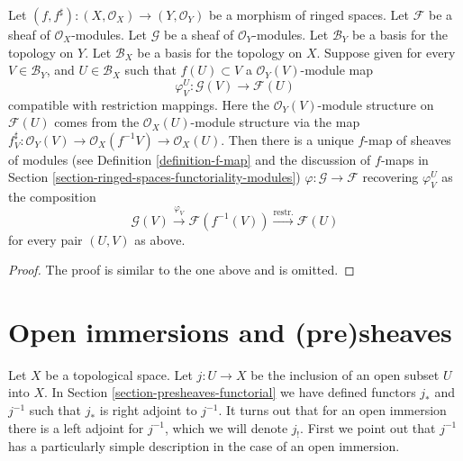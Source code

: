 \begin{lemma}
\label{lemma-f-map-basis-above-and-below-modules}
Let $(f, f^\sharp) : (X, \mathcal{O}_X) \to (Y, \mathcal{O}_Y)$
be a morphism of ringed spaces.
Let $\mathcal{F}$ be a sheaf of $\mathcal{O}_X$-modules.
Let $\mathcal{G}$ be a sheaf of $\mathcal{O}_Y$-modules.
Let $\mathcal{B}_Y$ be a basis for the topology on $Y$.
Let $\mathcal{B}_X$ be a basis for the topology on $X$.
Suppose given for every $V \in \mathcal{B}_Y$, and
$U \in \mathcal{B}_X$ such that $f(U) \subset V$ a
$\mathcal{O}_Y(V)$-module map
$$
\varphi_V^U :
\mathcal{G}(V)
\longrightarrow
\mathcal{F}(U)
$$
compatible with restriction mappings. Here the
$\mathcal{O}_Y(V)$-module structure on $\mathcal{F}(U)$
comes from the $\mathcal{O}_X(U)$-module structure
via the map $f^\sharp_V : \mathcal{O}_Y(V)
\to \mathcal{O}_X(f^{-1}V) \to \mathcal{O}_X(U)$.
Then there is a unique $f$-map of sheaves of modules (see
Definition \ref{definition-f-map} and the discussion
of $f$-maps in Section \ref{section-ringed-spaces-functoriality-modules})
$\varphi : \mathcal{G} \to \mathcal{F}$
recovering $\varphi_V^U$ as the composition
$$
\mathcal{G}(V) \xrightarrow{\varphi_V}
\mathcal{F}(f^{-1}(V)) \xrightarrow{\text{restr.}}
\mathcal{F}(U)
$$
for every pair $(U, V)$ as above.
\end{lemma}

\begin{proof}
The proof is similar to the one above and is omitted.
\end{proof}

\section{Open immersions and (pre)sheaves}
\label{section-open-immersions}

\noindent
Let $X$ be a topological space.
Let $j : U \to X$ be the inclusion of an open subset $U$ into $X$.
In Section \ref{section-presheaves-functorial} we have defined
functors $j_*$ and $j^{-1}$ such that $j_*$ is right adjoint to
$j^{-1}$. It turns out that for an open immersion there is a left adjoint
for $j^{-1}$, which we will denote $j_!$. First we point out that
$j^{-1}$ has a particularly simple description in the case of
an open immersion.

